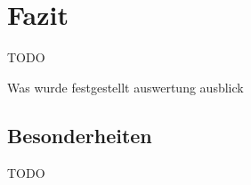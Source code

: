\chapter{Fazit}%

\label{cha:Fazit}
\colorbox{red!30}{TODO}

Was wurde festgestellt
auswertung ausblick

\section{Besonderheiten}

\colorbox{red!30}{TODO}

